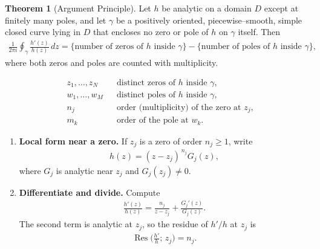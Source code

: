\documentclass[12pt]{article}
\title{}
\author{Jerich Lee}
\date{\today}
\theoremstyle{definition} %
\newtheorem{theorem}{Theorem}
\theoremstyle{plain} %
\begin{document}
\maketitle
\begin{theorem}[Argument Principle]
    Let $h$ be analytic on a domain $D$ except at finitely many poles, and let 
    $\gamma$ be a positively oriented, piecewise–smooth, simple closed curve lying in $D$ that encloses no zero or pole of $h$ on $\gamma$ itself.  
    Then
    \begin{align}
        \frac{1}{2\pi i}\oint_{\gamma} \frac{h'(z)}{h(z)}\,dz
        = 
        \bigl\{\text{number of zeros of $h$ inside $\gamma$}\bigr\}
        -
        \bigl\{\text{number of poles of $h$ inside $\gamma$}\bigr\},
    \end{align}
    where both zeros and poles are counted with multiplicity.
    
    \begin{align}
        &z_1,\dots,z_N &&\text{distinct zeros of $h$ inside $\gamma$},\\
        &w_1,\dots,w_M &&\text{distinct poles of $h$ inside $\gamma$},\\
        &n_j          &&\text{order (multiplicity) of the zero at } z_j,\\
        &m_k          &&\text{order of the pole at } w_k.
    \end{align}
    
    \begin{enumerate}
        \item\textbf{Local form near a zero.}  
        If $z_j$ is a zero of order $n_j\ge1$, write
        \begin{align}
            h(z)=(z-z_j)^{\,n_j}G_j(z),
        \end{align}
        where $G_j$ is analytic near $z_j$ and $G_j(z_j)\neq0$.
        
        \item\textbf{Differentiate and divide.}  
        Compute
        \begin{align}
            \frac{h'(z)}{h(z)}
            =
            \frac{n_j}{z-z_j}+\frac{G_j'(z)}{G_j(z)}.
        \end{align}
        The second term is analytic at $z_j$, so the residue of $h'/h$ at $z_j$ is
        \begin{align}
            \operatorname*{Res}\!\bigl(\tfrac{h'}{h};\,z_j\bigr)=n_j.
        \end{align}
        

\end{enumerate}
\end{theorem}
\end{document}
